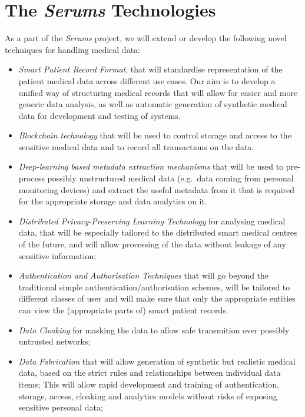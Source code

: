 \documentclass[sigconf]{acmart}
\begin{document}

\section{The \emph{Serums} Technologies}
\noindent
As a part of the \emph{Serums} project, we will extend or develop the following novel techniques for handling medical data:
\begin{itemize}
\item \emph{Smart Patient Record Format}, that will standardise representation of the patient medical data across different use cases. Our aim is to develop a unified way of structuring medical records that will allow for easier and more generic data analysis, as well as automatic generation of synthetic medical data for development and testing of systems.
\item \emph{Blockchain technology} that will be used to control storage and access to the sensitive medical data and to record all transactions on the data.
\item \emph{Deep-learning based metadata extraction mechanisms} that will be used to pre-process possibly unstructured medical data (e.g.~data coming from personal monitoring devices) and extract the useful metadata from it that is required for the appropriate storage and data analytics on it.
\item \emph{Distributed Privacy-Preserving Learning Technology} for analysing medical data, that will be especially tailored to the distributed smart medical centres of the future, and will allow processing of the data without leakage of any sensitive information;
\item \emph{Authentication and Authorisation Techniques} that will go beyond the traditional simple authentication/authorisation schemes, will be tailored to different classes of user and will make sure that only the appropriate entities can view the (appropriate parts of) smart patient records.
\item \emph{Data Cloaking} for masking the data to allow safe transmition over possibly untrusted networks;
\item \emph{Data Fabrication} that will allow generation of synthetic but realistic medical data, based on the strict rules and relationships between individual data items; This will allow rapid development and training of authentication, storage, access, cloaking and analytics models without risks of exposing sensitive personal data;
\end{itemize}
\end{document}
